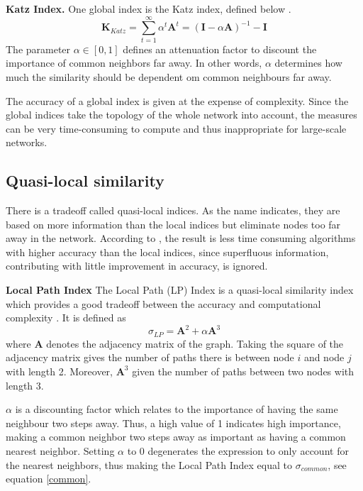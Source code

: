 \textbf{Katz Index.} One global index is the Katz index, defined below \citep{fouss2016algorithms}.
\begin{equation}
    \textbf{K}_{Katz}=\sum_{t=1}^{\infty} \alpha^t \textbf{A}^t = (\textbf{I}-\alpha \textbf{A})^{-1}-\textbf{I}
\end{equation}
The parameter $\alpha \in [0,1]$ defines an attenuation factor to discount the importance of common neighbors far away. In other words, $\alpha$ determines how much the similarity should be dependent om common neighbours far away.

The accuracy of a global index is given at the expense of complexity. Since the global indices take the topology of the whole network into account, the measures can be very time-consuming to compute and thus inappropriate for large-scale networks. 

\subsection{Quasi-local similarity}
There is a tradeoff called quasi-local indices. As the name indicates, they are based on more information than the local indices but eliminate nodes too far away in the network. According to \citet{lu2011}, the result is less time consuming algorithms with higher accuracy than the local indices, since superfluous information, contributing with little improvement in accuracy, is ignored.

\textbf{Local Path Index} The Local Path (LP) Index is a quasi-local similarity index which provides a good tradeoff between the accuracy and computational complexity \citep{lu2011}. It is defined as 
\begin{equation}
    \label{lp}
    \sigma_{LP} = \textbf{A}^2+\alpha \textbf{A}^3
\end{equation}
where $\textbf{A}$ denotes the adjacency matrix of the graph. Taking the square of the adjacency matrix gives the number of paths there is between node $i$ and node $j$ with length 2. Moreover, $\textbf{A}^3$ given the number of paths between two nodes with length 3. 

$\alpha$ is a discounting factor which relates to the importance of having the same neighbour two steps away. Thus, a high value of 1 indicates high importance, making a common neighbor two steps away as important as having a common nearest neighbor. Setting $\alpha$ to 0 degenerates the expression to only account for the nearest neighbors, thus making the Local Path Index equal to $\sigma_{common}$, see equation \eqref{common}.

